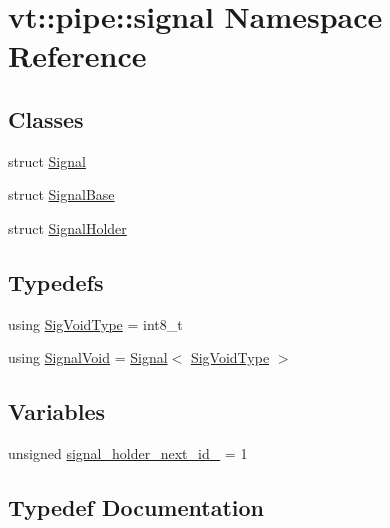 \hypertarget{namespacevt_1_1pipe_1_1signal}{}\section{vt\+:\+:pipe\+:\+:signal Namespace Reference}
\label{namespacevt_1_1pipe_1_1signal}
\subsection*{Classes}
\begin{DoxyCompactItemize}
\item 
struct \hyperlink{structvt_1_1pipe_1_1signal_1_1_signal}{Signal}
\item 
struct \hyperlink{structvt_1_1pipe_1_1signal_1_1_signal_base}{Signal\+Base}
\item 
struct \hyperlink{structvt_1_1pipe_1_1signal_1_1_signal_holder}{Signal\+Holder}
\end{DoxyCompactItemize}
\subsection*{Typedefs}
\begin{DoxyCompactItemize}
\item 
using \hyperlink{namespacevt_1_1pipe_1_1signal_acbe257d1ae44f20fa9fd9b6ed3057caf}{Sig\+Void\+Type} = int8\+\_\+t
\item 
using \hyperlink{namespacevt_1_1pipe_1_1signal_ac80a6a95b9545fa65856842a88ac6087}{Signal\+Void} = \hyperlink{structvt_1_1pipe_1_1signal_1_1_signal}{Signal}$<$ \hyperlink{namespacevt_1_1pipe_1_1signal_acbe257d1ae44f20fa9fd9b6ed3057caf}{Sig\+Void\+Type} $>$
\end{DoxyCompactItemize}
\subsection*{Variables}
\begin{DoxyCompactItemize}
\item 
unsigned \hyperlink{namespacevt_1_1pipe_1_1signal_ac8886465cfa962750b7fbec87ca9d5bc}{signal\+\_\+holder\+\_\+next\+\_\+id\+\_\+} = 1
\end{DoxyCompactItemize}


\subsection{Typedef Documentation}
\mbox{\label{namespacevt_1_1pipe_1_1signal_ac80a6a95b9545fa65856842a88ac6087}} 
